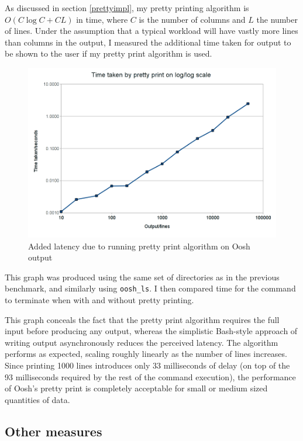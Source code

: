 \documentclass[12pt,twoside,notitlepage]{report}
\begin{document}
As discussed in section \ref{prettyimpl}, my pretty printing algorithm
is $O(C \log C + CL)$ in time, where $C$ is the number of columns and
$L$ the number of lines. Under the assumption that a typical workload
will have vastly more lines than columns in the output, I measured
the additional time taken for output to be shown to the user if my
pretty print algorithm is used.

\begin{figure}[h]
\caption{Added latency due to running pretty print algorithm on Oosh
  output}
\centering
\includegraphics[scale=0.5]{print_graph.png}
\end{figure}

This graph was produced using the same set of directories as in the
previous benchmark, and similarly using {\tt oosh\_ls}. I then
compared time for the command to terminate when with and without
pretty printing.

This graph conceals the fact that the pretty print algorithm requires
the full input before producing any output, whereas the simplistic
Bash-style approach of writing output asynchronously reduces the
perceived latency. The algorithm performs as expected, scaling roughly
linearly as the number of lines increases. Since printing 1000 lines
introduces only 33 milliseconds of delay (on top of the 93
milliseconds required by the rest of the command execution), the
performance of Oosh's pretty print is completely acceptable for small
or medium sized quantities of data.

\subsection{Other measures}
\label{othermeasures}
\end{document}
